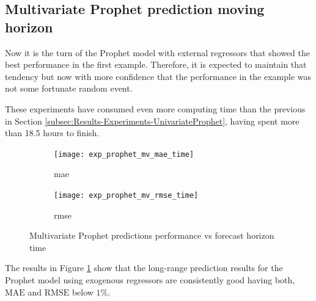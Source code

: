 %



\subsection{Multivariate Prophet prediction moving horizon}

Now it is the turn of the Prophet model with external regressors that showed the best performance in the first example. Therefore, it is expected to maintain that tendency but now with more confidence that the performance in the example was not some fortunate random event.

These experiments have consumed even more computing time than the previous in Section \ref{subsec:Results-Experiments-UnivariateProphet}, having spent more than 18.5 hours to finish.

\begin{figure}[H]
	\centering
	\begin{subfigure}{0.49\linewidth}
		\texttt{[image: exp\_prophet\_mv\_mae\_time]}
		\caption{\ac{mae}}
	\end{subfigure}
	\hfill
	\begin{subfigure}{0.49\linewidth}
		\texttt{[image: exp\_prophet\_mv\_rmse\_time]}
		\caption{\ac{rmse}}
	\end{subfigure}
	\caption{Multivariate Prophet predictions performance vs forecast horizon time}
	\label{fig:multi_prophet_performances}
\end{figure}

The results in Figure \ref{fig:multi_prophet_performances} show that the long-range prediction results for the Prophet model using exogenous regressors are consistently good having both, $\text{MAE}$ and $\text{RMSE}$ below $1\%$.

